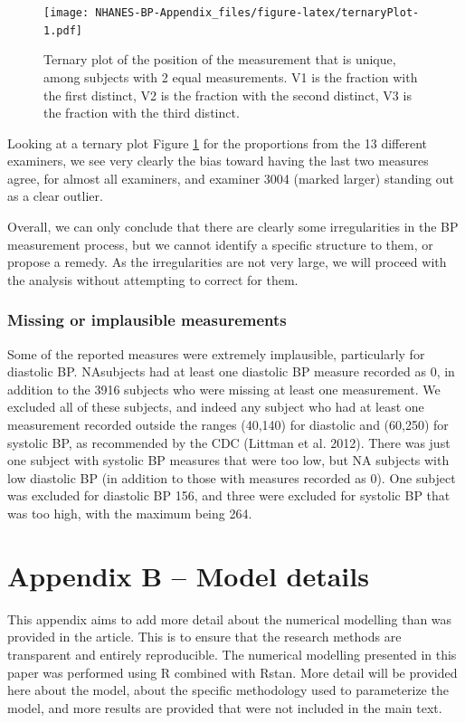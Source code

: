 \documentclass[
]{article}
\begin{document}
\begin{figure}
\centering
\texttt{[image: NHANES-BP-Appendix\_files/figure-latex/ternaryPlot-1.pdf]}
\caption{\label{fig:ternaryPlot}Ternary plot of the position of the measurement that is unique, among subjects with 2 equal measurements. V1 is the fraction with the first distinct, V2 is the fraction with the second distinct, V3 is the fraction with the third distinct.}
\end{figure}

Looking at a ternary plot Figure \ref{fig:ternaryPlot} for the proportions from the 13 different examiners, we see very clearly the bias toward having the last two measures agree, for almost all examiners, and examiner 3004 (marked larger) standing out as a clear outlier.

Overall, we can only conclude that there are clearly some irregularities in the BP measurement process, but we cannot identify a specific structure to them, or propose a remedy.
As the irregularities are not very large, we will proceed with the analysis without attempting to correct for them.

\subsubsection{Missing or implausible measurements}\label{sec:BPrange}

Some of the reported measures were extremely implausible, particularly for diastolic BP. NAsubjects had at least one diastolic BP measure recorded as 0, in addition to the 3916 subjects who were missing at least one measurement. We excluded all of these subjects, and indeed any subject who had at least one measurement recorded outside the ranges (40,140) for diastolic and (60,250) for systolic BP, as recommended by the CDC (Littman et al. 2012).
There was just one subject with systolic BP measures that were too low, but NA subjects with low diastolic BP (in addition to those with measures recorded as 0).
One subject was excluded for diastolic BP 156, and three were excluded for systolic BP that was too high, with the maximum being 264.

\newpage

\section{Appendix B -- Model details}\label{appendix-b-model-details}

This appendix aims to add more detail about the numerical modelling than was provided in the article. This is to ensure that the research methods are transparent and entirely reproducible. The numerical modelling presented in this paper was performed using R combined with Rstan. More detail will be provided here about the model, about the specific methodology used to parameterize the model, and more results are provided that were not included in the main text.
\end{document}

